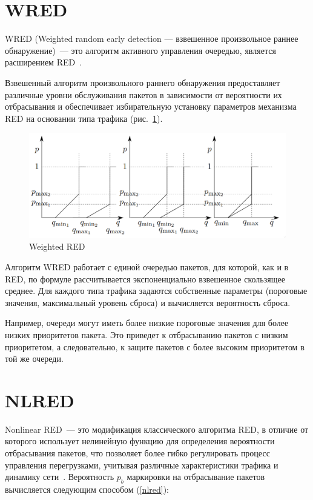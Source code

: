 \section{WRED}

WRED (Weighted random early detection --- взвешенное произвольное раннее
обнаружение)~--- это алгоритм активного управления очередью, является
расширением RED~\cite{WRED}.

Взвешенный алгоритм произвольного раннего обнаружения предоставляет
различные уровни обслуживания пакетов в зависимости от вероятности их
отбрасывания и обеспечивает избирательную установку параметров
механизма RED на основании типа трафика (рис.~\ref{fig:2.3}).

\begin{figure}[!h]
  \centering
  \includegraphics[width=0.7\linewidth]{image/wred.png}
  \caption{Weighted RED}
  \label{fig:2.3}
\end{figure}

Алгоритм WRED работает с единой очередью пакетов, для которой, как и в
RED, по формуле рассчитывается экспоненциально взвешенное скользящее
среднее. Для каждого типа трафика задаются собственные параметры
(пороговые значения, максимальный уровень сброса) и вычисляется
вероятность сброса.

Например, очереди могут иметь более низкие пороговые значения для
более низких приоритетов пакета. Это приведет к отбрасыванию пакетов с
низким приоритетом, а следовательно, к защите пакетов с более высоким
приоритетом в той же очереди.

\section{NLRED}

Nonlinear RED~--- это модификация классического алгоритма RED, в
отличие от которого использует нелинейную функцию для определения
вероятности отбрасывания пакетов, что позволяет более гибко
регулировать процесс управления перегрузками, учитывая различные
характеристики трафика и динамику
сети~\cite{NLRED1,NLRED2}. Вероятность $p_{b}$ маркировки на
отбрасывание пакетов вычисляется следующим способом (\ref{nlred}):

